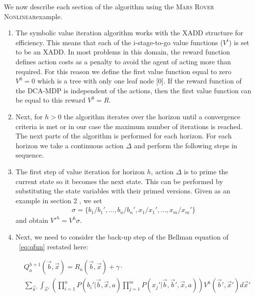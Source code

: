 \documentclass[letterpaper]{article}
\newcommand{\MarsRoverNL}{\textsc{Mars Rover Nonlinear}}
\begin{document}
\decmargin{1em}

We now describe each section of the algorithm using the \MarsRoverNL example. 

\begin{enumerate}
\item The symbolic value iteration algorithm works with the XADD structure for efficiency. This means that each of the i-stage-to-go value functions ($V^i$) is set to be an XADD. In most problems in this domain, the reward function defines action costs as a penalty to avoid the agent of acting more than required. For this reason we define the first value function equal to zero $V^0=0$ which is a tree with only one leaf node [0]. If the reward function of the DCA-MDP is independent of the actions, then the first value function can be equal to this reward $V^0=R$.\\

\item Next, for $h > 0$ the algorithm iterates over the horizon until a convergence criteria is met or in our case the maximum number of iterations is reached. The next parts of the algorithm is performed for each horizon. For each horizon we take a continuous action $\Delta$ and perform the following steps in sequence.\\

\item The first step of value iteration for horizon $h$, action $\Delta$ is to prime the current state so it becomes the next state. This can be performed by substituting the state variables with their primed versions. Given as an example in section 2 , we set
{\footnotesize
\begin{align*}
\sigma = \{ b_1 / b_1', \ldots, b_n / b_n', x_1 / x_1', \ldots, x_m / x_m' \}
\end{align*}
}
and obtain $V'^{h} = V^{h}\sigma$.

\item Next, we need to consider the back-up step of the Bellman equation of ~\eqref{eq:qfun} restated here: 
 \vspace{-3mm}
 
 {\footnotesize
 \begin{align}
 & Q_a^{h+1}(\vec{b},\vec{x}) = R_a(\vec{b},\vec{x}) + \gamma \cdot \label{eq:qfun} \\ 
 & \sum_{\vec{b}'} \int_{\vec{x}'} \left( \prod_{i=1}^n P(b_i'|\vec{b},\vec{x},a) \prod_{j=1}^m P(x_j'|\vec{b},\vec{b}',\vec{x},a) \right) V^h(\vec{b}',\vec{x}') d\vec{x}' \nonumber
 \end{align}}
 

\end{enumerate}
\end{document}
